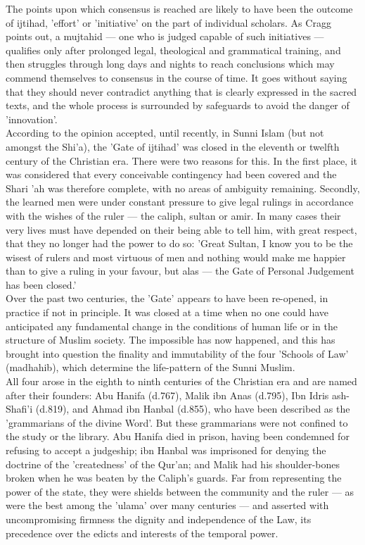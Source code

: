 \documentclass[10pt, twoside,openright]{book}
\begin{document}
The points upon which consensus is reached are likely to have been the outcome of ijtihad, 'effort' 
or 'initiative' on the part of individual scholars. As Cragg points out, a mujtahid --- one who is 
judged capable of such initiatives --- qualifies only after prolonged legal, theological and 
grammatical training, and then struggles through long days and nights to reach conclusions which may 
commend themselves to consensus in the course of time. It goes without saying that they should never 
contradict anything that is clearly expressed in the sacred texts, and the whole process is 
surrounded by safeguards to avoid the danger of 'innovation'. \\

According to the opinion accepted, until recently, in Sunni Islam (but not amongst the Shi'a), the 
'Gate of ijtihad' was closed in the eleventh or twelfth century of the Christian era. There were two 
reasons for this. In the first place, it was considered that every conceivable contingency had been 
covered and the Shari 'ah was therefore complete, with no areas of ambiguity remaining. Secondly, the 
learned men were under constant pressure to give legal rulings in accordance with the wishes of the 
ruler --- the caliph, sultan or amir. In many cases their very lives must have depended on their being 
able to tell him, with great respect, that they no longer had the power to do so: 'Great Sultan, I 
know you to be the wisest of rulers and most virtuous of men and nothing would make me happier than 
to give a ruling in your favour, but alas --- the Gate of Personal Judgement has been closed.' \\

Over the past two centuries, the 'Gate' appears to have been re\hyp{}opened, in practice if not in 
principle. It was closed at a time when no one could have anticipated any fundamental change in the 
conditions of human life or in the structure of Muslim society. The impossible has now happened, and 
this has brought into question the finality and immutability of the four 'Schools of Law' (madhahib), 
which determine the life\hyp{}pattern of the Sunni Muslim. \\

All four arose in the eighth to ninth centuries of the Christian era and are named after their 
founders: Abu Hanifa (d.767), Malik ibn Anas (d.795), Ibn Idris ash\hyp{}Shafi'i (d.819), and Ahmad ibn 
Hanbal (d.855), who have been described as the 'grammarians of the divine Word'. But these 
grammarians were not confined to the study or the library. Abu Hanifa died in prison, having been 
condemned for refusing to accept a judgeship; ibn Hanbal was imprisoned for denying the doctrine of 
the 'createdness' of the Qur'an; and Malik had his shoulder\hyp{}bones broken when he was beaten by the 
Caliph's guards. Far from representing the power of the state, they were shields between the 
community and the ruler --- as were the best among the 'ulama' over many centuries --- and asserted with 
uncompromising firmness the dignity and independence of the Law, its precedence over the edicts and 
interests of the temporal power. \\
\end{document}
